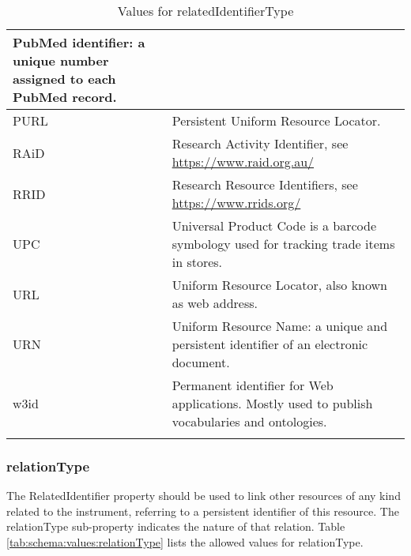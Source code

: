 \documentclass[titlepage=true,twoside=false,DIV=13]{scrartcl}
\begin{document}
\begin{longtable}{|l|p{\valdefcolw}|}
  PubMed identifier: a unique number assigned to each PubMed record.
  \\ \hline
  PURL    &
  Persistent Uniform Resource Locator.
  \\ \hline
  RAiD    &
  Research Activity Identifier, see \url{https://www.raid.org.au/}
  \\ \hline
  RRID    &
  Research Resource Identifiers, see \url{https://www.rrids.org/}
  \\ \hline
  UPC     &
  Universal Product Code is a barcode symbology used for tracking
  trade items in stores.
  \\ \hline
  URL     &
  Uniform Resource Locator, also known as web address.
  \\ \hline
  URN     &
  Uniform Resource Name: a unique and persistent identifier of an
  electronic document.
  \\ \hline
  w3id    &
  Permanent identifier for Web applications.  Mostly used to publish
  vocabularies and ontologies.
  \\ \hline
  \caption{Values for relatedIdentifierType}
  \label{tab:schema:values:relatedIdentifierType}
\end{longtable}

\subsubsection{relationType}

The RelatedIdentifier property should be used to link other resources
of any kind related to the instrument, referring to a persistent
identifier of this resource.  The relationType sub-property indicates
the nature of that relation.  Table
\ref{tab:schema:values:relationType} lists the allowed values for
relationType.
\end{document}
